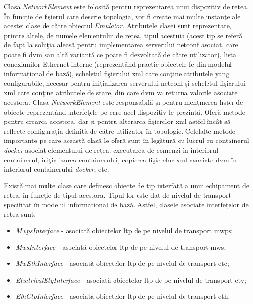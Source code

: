 Clasa \textit{NetworkElement} este folosită pentru reprezentarea unui dispozitiv de rețea. În funcție de fişierul care descrie topologia, vor fi create mai multe instanţe ale acestei clase de către obiectul \textit{Emulator}. Atributele clasei sunt reprezentate, printre altele, de numele elementului de rețea, tipul acestuia (acest tip se referă de fapt la soluţia aleasă pentru implementarea serverului \gls{netconf} asociat, care poate fi \gls{dvm} sau altă variantă ce poate fi dezvoltată de către utilizator), lista conexiunilor Ethernet interne (reprezentând practic obiectele \gls{fc} din modelul informațional de bază), scheletul fişierului \gls{xml} care conţine atributele \gls{yang} configurabile, necesar pentru iniţializarea serverului \gls{netconf} și scheletul fişierului \gls{xml} care conţine atributele de stare, din care \gls{dvm} va returna valorile asociate acestora. Clasa \textit{NetworkElement} este responsabilă și pentru menținerea listei de obiecte reprezentând interfeţele pe care acel dispozitiv le prezintă. Oferă metode pentru crearea acestora, dar și pentru alterarea fişierelor \gls{xml} astfel încât să reflecte configurația definită de către utilizator în topologie. Celelalte metode importante pe care această clasă le oferă sunt în legătură cu lucrul cu containerul \textit{docker} asociat elementului de rețea: executarea de comenzi în interiorul containerul, iniţializarea containerului, copierea fişierelor \gls{xml} asociate \gls{dvm} în interiorul containerului \textit{docker}, etc.

Există mai multe clase care definesc obiecte de tip interfață a unui echipament de rețea, în funcție de tipul acestora. Tipul lor este dat de nivelul de transport specificat în modelul informațional de bază. Astfel, clasele asociate interfețelor de rețea sunt:
\begin{itemize}
	\item \textit{MwpsInterface} - asociată obiectelor \gls{ltp} de pe nivelul de transport \gls{mwps};
	\item \textit{MwsInterface} - asociată obiectelor \gls{ltp} de pe nivelul de transport \gls{mws};
	\item \textit{MwEthInterface} - asociată obiectelor \gls{ltp} de pe nivelul de transport \gls{etc};
	\item \textit{ElectricalEtyInterface} - asociată obiectelor \gls{ltp} de pe nivelul de transport \gls{ety};
	\item \textit{EthCtpInterface} - asociată obiectelor \gls{ltp} de pe nivelul de transport \gls{eth}.
\end{itemize}

